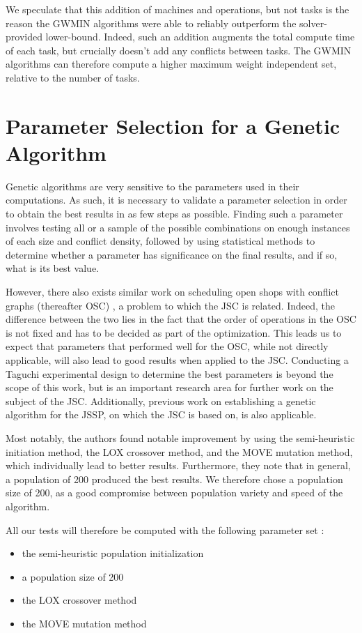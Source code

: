 \documentclass{mimosis}
\begin{document}
We speculate that this addition of machines and operations, but not tasks is the reason the GWMIN algorithms were able to reliably outperform the solver-provided lower-bound. Indeed, such an addition augments the total compute time of each task, but crucially
doesn’t add any conflicts between tasks. The GWMIN algorithms can therefore compute a higher maximum weight independent set, relative to the number of tasks. 

\section{Parameter Selection for a Genetic Algorithm}

Genetic algorithms are very sensitive to the parameters used in their computations. As such, it is necessary to validate a parameter selection in order to obtain the best results in as few steps as possible. Finding such a parameter involves testing all or a sample of the possible combinations on enough instances of each size and conflict density, followed by using statistical methods to determine whether a parameter has significance on the final results, and if so, what is its best value.

However, there also exists similar work on scheduling open shops with conflict graphs (thereafter OSC) \citep{tellache2023genetic}, a problem to which the JSC is related. Indeed, the difference between the two lies in the fact that the order of operations in the OSC is not fixed and has to be decided as part of the optimization. This leads us to expect that parameters that performed well for the OSC, while not directly applicable, will also lead to good results when applied to the JSC. Conducting a Taguchi experimental design to determine the best parameters is beyond the scope of this work, but is an important research area for further work on the subject of the JSC. Additionally, previous work \citep{falkenauer1991genetic} on establishing a genetic algorithm for the JSSP, on which the JSC is based on, is also applicable.

Most notably, the authors found notable improvement by using the semi-heuristic initiation method, the LOX crossover method, and the MOVE mutation method, which individually lead to better results. Furthermore, they note that in general, a population of 200 produced the best results. We therefore chose a population size of 200, as a good compromise between population variety and speed of the algorithm.

All our tests will therefore be computed with the following parameter set :
\begin{itemize}
\item the semi-heuristic population initialization
\item a population size of 200
\item the LOX crossover method
\item the MOVE mutation method
\end{itemize}
\end{document}
